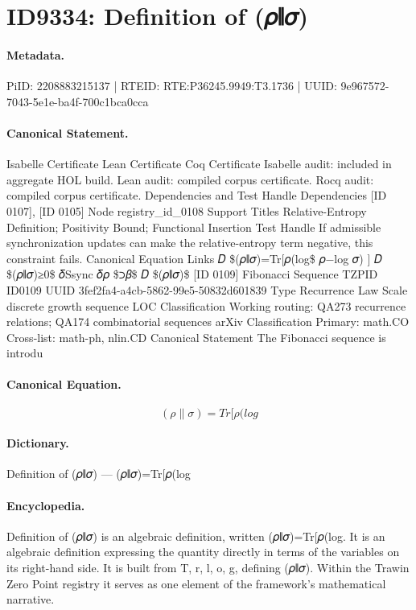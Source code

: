 \section*{ID9334: Definition of (𝜌∥𝜎)}
\paragraph{Metadata.}
PiID: 2208883215137 | RTEID: RTE:P36245.9949:T3.1736 | UUID: 9e967572-7043-5e1e-ba4f-700c1bca0cca

\paragraph{Canonical Statement.}
Isabelle Certificate Lean Certificate Coq Certificate Isabelle audit: included in aggregate HOL build. Lean audit: compiled corpus certificate. Rocq audit: compiled corpus certificate. Dependencies and Test Handle Dependencies [ID 0107], [ID 0105] Node registry\_id\_0108 Support Titles Relative-Entropy Definition; Positivity Bound; Functional Insertion Test Handle If admissible synchronization updates can make the relative-entropy term negative, this constraint fails. Canonical Equation Links 𝐷 \$(𝜌∥𝜎)=Tr[𝜌(log\$ 𝜌−log 𝜎) ] 𝐷 \$(𝜌∥𝜎)≥0\$ 𝛿Ssync 𝛿𝜌 \$⊃𝛽\$ 𝐷 \$(𝜌∥𝜎)\$ [ID 0109] Fibonacci Sequence TZPID ID0109 UUID 3fef2fa4-a4cb-5862-99e5-50832d601839 Type Recurrence Law Scale discrete growth sequence LOC Classification Working routing: QA273 recurrence relations; QA174 combinatorial sequences arXiv Classification Primary: math.CO Cross-list: math-ph, nlin.CD Canonical Statement The Fibonacci sequence is introdu

\paragraph{Canonical Equation.}
\[
(𝜌∥𝜎)=Tr[𝜌(log
\]

\paragraph{Dictionary.}
Definition of (𝜌∥𝜎) — (𝜌∥𝜎)=Tr[𝜌(log

\paragraph{Encyclopedia.}
Definition of (𝜌∥𝜎) is an algebraic definition, written (𝜌∥𝜎)=Tr[𝜌(log. It is an algebraic definition expressing the quantity directly in terms of the variables on its right-hand side. It is built from T, r, l, o, g, defining (𝜌∥𝜎). Within the Trawin Zero Point registry it serves as one element of the framework's mathematical narrative.
